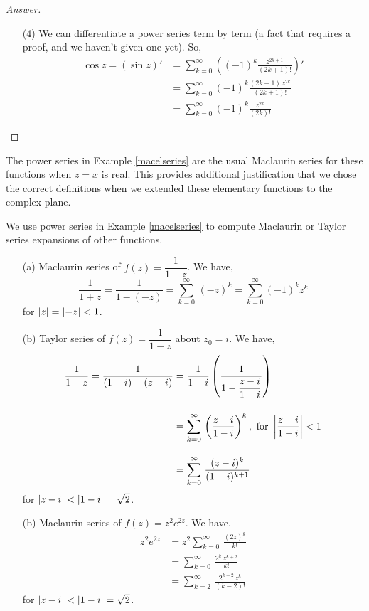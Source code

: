\begin{example}
\begin{proof}[Answer]
\begin{itemize}
\item[(4)] We can differentiate a power series term by term (a fact that requires a proof, and we haven't given one yet). So,
\begin{align*}
\cos z = (\sin z)' &= \sum_{k = 0}^\infty\left((-1)^{k}\frac{z^{2k+1}}{(2k+1)!}\right)'\\[1em]
 &= \sum_{k = 0}^\infty(-1)^{k}\frac{(2k+1)\,z^{2k}}{(2k+1)!}\\[1em]
 &= \sum_{k = 0}^\infty(-1)^{k}\frac{z^{2k}}{(2k)!}
\end{align*}
\end{itemize}
\end{proof}
\end{example}

\vspace*{1em}

\begin{remark}
The power series in Example \ref{macelseries} are the usual Maclaurin series for these functions when $z = x$ is real. This provides additional justification that we chose the correct definitions when we extended these elementary functions to the complex plane. 
\end{remark}

\vspace*{1em}

\begin{example}
We use power series in Example \ref{macelseries} to compute Maclaurin or Taylor series expansions of other functions.
\begin{itemize}
\item[(a)] Maclaurin series of $f(z) = \dfrac{1}{1 + z}$. We have,
\[\frac{1}{1 + z} = \frac{1}{1 - (-z)} = \sum_{k = 0}^\infty\,(-z)^k = \sum_{k = 0}^\infty(-1)^kz^k\]
for $\left\lvert z\right\rvert = \left\lvert-z\right\rvert < 1$. 

\item[(b)] Taylor series of $f(z) = \dfrac{1}{1 - z}$ about $z_0 = i$. We have,
\begin{align*}
\frac{1}{1 - z} = \frac{1}{(1-i) - (z - i)} &= \frac{1}{1 - i}\left(\frac{1}{1 - \dfrac{z - i}{1 - i}}\right)\\[1em]
&= \sum_{k = 0}^\infty\,\left(\frac{z - i}{1 - i}\right)^k,\ \text{for }\abs{\frac{z - i}{1 - i}} <1\\[1em]
&= \sum_{k = 0}^\infty\,\frac{(z - i)^k}{(1 - i)^{k+1}}
\end{align*}
for $\left\lvert z - i\right\rvert < \left\lvert1-i\right\rvert = \sqrt{2}$.

\item[(b)] Maclaurin series of $f(z) = z^2e^{2z}$. We have,
\begin{align*}
z^2e^{2z} &= z^2\sum_{k = 0}^\infty\,\frac{(2z)^k}{k!}\\[1em]
 &= \sum_{k = 0}^\infty\,\frac{2^k\,z^{k+2}}{k!}\\[1em]
 &= \sum_{k = 2}^\infty\,\frac{2^{k-2}\,z^{k}}{(k-2)!}
\end{align*}
for $\left\lvert z - i\right\rvert < \left\lvert1-i\right\rvert = \sqrt{2}$. 
\end{itemize}
\end{example}


